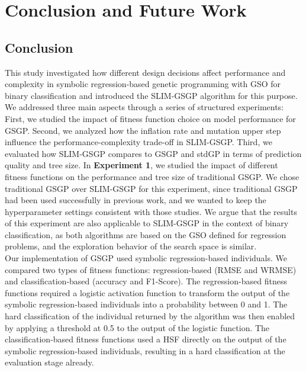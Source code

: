 \documentclass[manuscript, review, anonymous]{acmart} %
\begin{document}
%
%

\section{Conclusion and Future Work}
\label{cha:conclusion}

\subsection{Conclusion}
This study investigated how different design decisions affect performance 
and complexity in symbolic regression-based genetic programming with GSO for binary classification
and introduced the SLIM-GSGP algorithm for this purpose.
We addressed three main aspects through a series of structured experiments:
First, we studied the impact of fitness function choice on model performance for GSGP.
Second, we analyzed how the inflation rate and mutation upper step influence the performance-complexity trade-off in SLIM-GSGP.
Third, we evaluated how SLIM-GSGP compares to GSGP and stdGP in terms of prediction quality and tree size.
In \textbf{Experiment 1}, 
we studied the impact of different fitness functions on the performance and tree size of traditional GSGP.
We chose traditional GSGP over SLIM-GSGP for this experiment, since
traditional GSGP had been used successfully in previous work,
and we wanted to keep the hyperparameter settings consistent with those studies.
We argue that the results of this experiment are also applicable to SLIM-GSGP in the context of binary classification,
as both algorithms are based on the GSO defined for regression problems, and the exploration behavior 
of the search space is similar.\\
Our implementation of GSGP used symbolic regression-based individuals.
We compared two types of fitness functions: regression-based (RMSE and WRMSE) and classification-based (accuracy and F1-Score).
The regression-based fitness functions required a 
logistic activation function to transform the output of the symbolic regression-based individuals into a probability between 0 and 1.
The hard classification of the individual returned by the algorithm was then enabled by applying a threshold at 0.5 to 
the output of the logistic function.
The classification-based fitness functions used a HSF directly on the output of the symbolic regression-based individuals,
resulting in a hard classification at the evaluation stage already.\\
\end{document}
